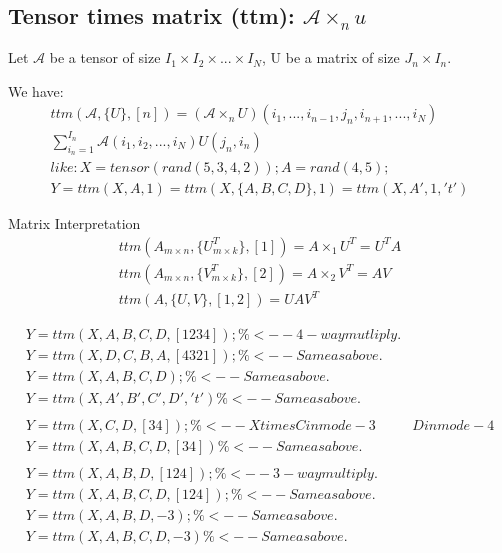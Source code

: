 \documentclass{Note}
\begin{document}
\subsection{Tensor times matrix (ttm): $\mathcal{A}{\times}_n u$}
Let $\mathcal{A}$ be a tensor of size $I_1\times I_2\times ...\times I_N$, U be a matrix of size $J_n\times I_n$.

We have:
\begin{equation}
\begin{aligned}
ttm(\mathcal{A},\{U\},[n])=(\mathcal{A}{\times}_n U)(i_1,...,i_{n-1},j_{n},i_{n+1},...,i_N)\\
\sum_{i_n=1}^{I_n}\mathcal{A}(i_1,i_2,...,i_N)U(j_n, i_n)\\
like:X = tensor(rand(5,3,4,2));
A = rand(4,5);\\
Y = ttm(X, A, 1)= ttm(X, \{A,B,C,D\}, 1)= ttm(X, A', 1, 't')    
\end{aligned}
\end{equation}

Matrix Interpretation
\begin{equation}
\begin{aligned}
ttm(A_{m\times n},\{U_{m\times k}^T\},[1])=A\times _1 U^T=U^TA\\
ttm(A_{m\times n},\{V_{m\times k}^T\},[2])=A\times _2 V^T=AV\\
ttm(A,\{U,V\},[1,2])=UAV^T
\end{aligned}
\end{equation}

\begin{equation}
\begin{aligned}
Y = ttm(X, {A,B,C,D}, [1 2 3 4]); \%<-- 4-way mutliply.\\
Y = ttm(X, {D,C,B,A}, [4 3 2 1]); \%<-- Same as above.\\
Y = ttm(X, {A,B,C,D});            \%<-- Same as above.\\
Y = ttm(X, {A',B',C',D'}, 't')    \%<-- Same as above.\\
\\
Y = ttm(X, {C,D}, [3 4]);    \%<-- X times C in mode-3 & D in mode-4\\
Y = ttm(X, {A,B,C,D}, [3 4]) \%<-- Same as above.\\
\\
Y = ttm(X, {A,B,D}, [1 2 4]);  \%<-- 3-way multiply.\\
Y = ttm(X, {A,B,C,D}, [1 2 4]); \%<-- Same as above.\\
Y = ttm(X, {A,B,D}, -3);        \%<-- Same as above.\\
Y = ttm(X, {A,B,C,D}, -3)       \%<-- Same as above.\\
\end{aligned}
\end{equation}
\end{document}
